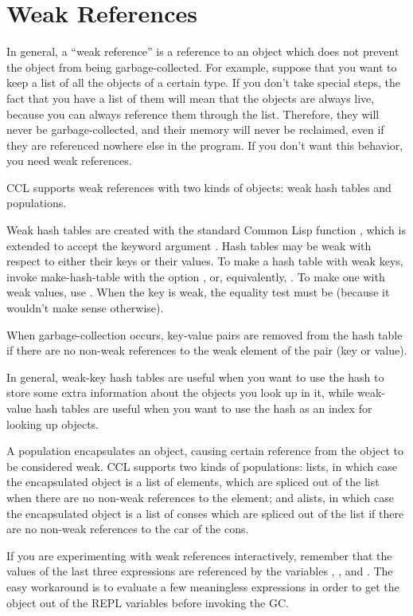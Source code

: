 \section{Weak References}

In general, a ``weak reference'' is a reference to an object which
does not prevent the object from being garbage-collected. For example,
suppose that you want to keep a list of all the objects of a certain
type. If you don't take special steps, the fact that you have a list
of them will mean that the objects are always live, because you can
always reference them through the list. Therefore, they will never be
garbage-collected, and their memory will never be reclaimed, even if
they are referenced nowhere else in the program. If you don't want
this behavior, you need weak references.

CCL supports weak references with two kinds of objects: weak hash
tables and populations.

Weak hash tables are created with the standard Common Lisp function
, which is extended to accept the keyword argument
. Hash tables may be weak with respect to either their keys
or their values. To make a hash table with weak keys, invoke
make-hash-table with the option , or, equivalently,
. To make one with weak values, use .
When the key is weak, the equality test must be 
(because it wouldn't make sense otherwise).

When garbage-collection occurs, key-value pairs are removed from the
hash table if there are no non-weak references to the weak element of
the pair (key or value).

In general, weak-key hash tables are useful when you want to use the
hash to store some extra information about the objects you look up in
it, while weak-value hash tables are useful when you want to use the
hash as an index for looking up objects.

A population encapsulates an object, causing certain reference from
the object to be considered weak. CCL supports two kinds of
populations: lists, in which case the encapsulated object is a list of
elements, which are spliced out of the list when there are no non-weak
references to the element; and alists, in which case the encapsulated
object is a list of conses which are spliced out of the list if there
are no non-weak references to the car of the cons.

If you are experimenting with weak references interactively, remember
that the values of the last three expressions are referenced by the
variables \cd{*}, \cd{**}, and \cd{***}. The easy workaround is to
evaluate a few meaningless expressions in order to get the object out
of the REPL variables before invoking the GC.

